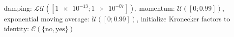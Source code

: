 damping: $\mathcal{LU}([\num[scientific-notation=true]{1e-13}; \num[scientific-notation=true]{1e-07}])$, momentum: $\mathcal{U}([0; \num[scientific-notation=true]{0.99}])$, exponential moving average: $\mathcal{U}([0; \num[scientific-notation=true]{0.99}])$, initialize Kronecker factors to identity: $\mathcal{C}(\{\text{no},\text{yes}\})$